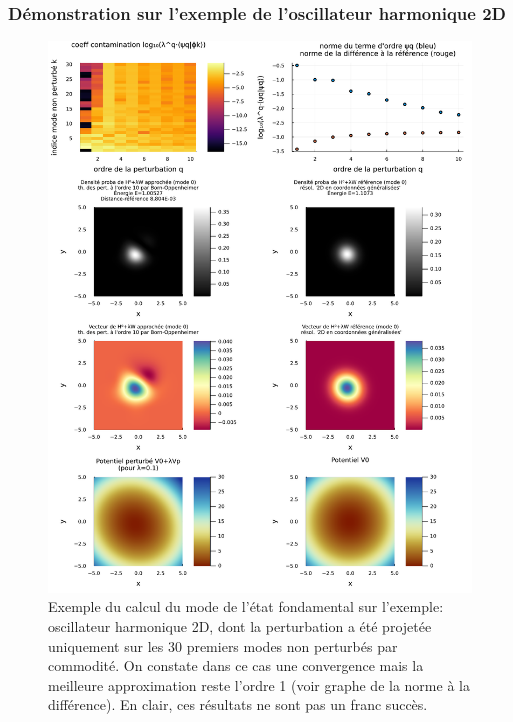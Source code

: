\documentclass[svgnames,dvipsnames,a4paper,10pt,french]{report}
\begin{document}
\subsubsection{Démonstration sur l'exemple de l'oscillateur harmonique 2D}





\begin{figure}[H]
    \centering
    \includegraphics[width=\textwidth]{images/th_pert_exemple.pdf}
    \caption[Résultats de la méthode \textit{sum over states} pour l'OHQ 2D]{Exemple du calcul du mode de l'état fondamental sur l'exemple: oscillateur harmonique 2D, dont la perturbation a été projetée uniquement sur les 30 premiers modes non perturbés par commodité. On constate dans ce cas une convergence mais la meilleure approximation reste l'ordre 1 (voir graphe de la norme à la différence). En clair, ces résultats ne sont pas un franc succès.}
    \label{fig:ex_th_pert}
\end{figure}
    
\end{document}
